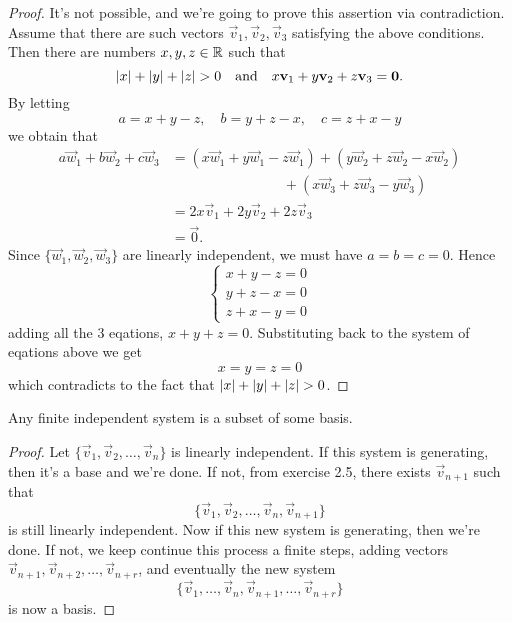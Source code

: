 \documentclass{article}
\begin{document}
\begin{proof}
  It's not possible, and we're going to prove this assertion via contradiction.
  Assume that there are such vectors $\vec{v}_1,\vec{v}_2,\vec{v}_3$
  satisfying the above conditions. Then there are numbers $x,y,z\in\R$
  such that
  \[
    \lvert x\rvert+\lvert y\rvert+\lvert z\rvert>0
    \quad\text{and}\quad
    x\mathbf{v}_1+y\mathbf{v}_2+z\mathbf{v}_3=\mathbf{0}.
  \]
  By letting 
  \[a=x+y-z,\quad b=y+z-x,\quad c=z+x-y\]
  we obtain that
  \begin{align*}
    a\vec{w}_1+b\vec{w}_2+c\vec{w}_3
    &=(x\vec{w}_1+y\vec{w}_1-z\vec{w}_1)
     +(y\vec{w}_2+z\vec{w}_2-x\vec{w}_2)\\
    &\qquad\qquad\qquad\qquad +(x\vec{w}_3+z\vec{w}_3-y\vec{w}_3)\\
    &=2x\vec{v}_1+2y\vec{v}_2+2z\vec{v}_3\\
    &=\vec{0}.
  \end{align*}
  Since $\{\vec{w}_1,\vec{w}_2,\vec{w}_3\}$
  are linearly independent, we must have $a=b=c=0$. Hence
  \[
    \begin{cases}
      x+y-z=0\\
      y+z-x=0\\
      z+x-y=0
    \end{cases}
  \]
  adding all the 3 eqations, $x+y+z=0$. Substituting back to the 
  system of eqations above we get
  \[x=y=z=0\]
  which contradicts to the fact that $\lvert x\rvert+\lvert y\rvert+\lvert z\rvert>0$.
\end{proof}
\begin{exercise}
  Any finite independent system is a subset of some basis.
\end{exercise}
\begin{proof}
  Let $\{\vec{v}_1,\vec{v}_2,\dots,\vec{v}_n\}$ is linearly independent.
  If this system is generating, then it's a base and we're done. If not,
  from exercise 2.5, there exists $\vec{v}_{n+1}$ such that
  \[\{\vec{v}_1,\vec{v}_2,\dots,\vec{v}_n,\vec{v}_{n+1}\}\]
  is still linearly independent. Now if this new system is generating, then 
  we're done. If not, we keep continue this process a finite steps, 
  adding vectors $\vec{v}_{n+1},\vec{v}_{n+2},\dots,\vec{v}_{n+r}$, and 
  eventually the new system
  \[\{\vec{v}_1,\dots,\vec{v}_{n},\vec{v}_{n+1},\dots,\vec{v}_{n+r}\}\]
  is now a basis.
\end{proof}
\end{document}
